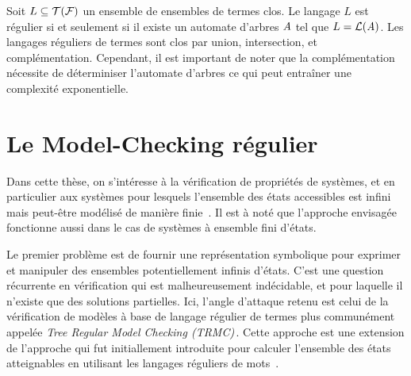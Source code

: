 
Soit $L \subseteq \mathcal{T(F)}$ un ensemble de ensembles de termes clos. Le langage $L$ est régulier si et seulement si il existe
un automate d'arbres $\mathit A$ tel que $L = \mathcal{L}(\mathit A)$. Les langages réguliers de termes sont clos par union, intersection, et 
complémentation. Cependant, il est important de noter que la complémentation nécessite de déterminiser l'automate d'arbres
ce qui peut entraîner une complexité exponentielle.

\section{Le Model-Checking régulier}

Dans cette thèse, on s'intéresse à la vérification de propriétés de systèmes,
et en particulier aux systèmes pour lesquels l'ensemble des états accessibles
est infini mais peut-être modélisé de manière finie~\cite{WB98}. 
Il est à noté que l'approche envisagée fonctionne aussi 
dans le cas de systèmes à ensemble fini d'états.

Le premier problème est de fournir une représentation symbolique 
pour exprimer et manipuler des ensembles potentiellement infinis
d'états. C'est une question récurrente en vérification qui est malheureusement
indécidable, et pour laquelle il n'existe que des solutions partielles.
Ici, l'angle d'attaque retenu est celui de la vérification de modèles
à base de langage régulier de termes plus communément appelée {\em Tree Regular Model Checking
  (TRMC)}\,\cite{ALRd05}. Cette approche est une extension de l'approche qui fut initiallement introduite
pour calculer l'ensemble des états atteignables en utilisant les langages réguliers de mots~\cite{BJNT00,BLW03}.


